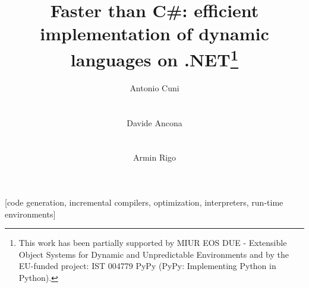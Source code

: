 \documentclass{sig-alternate}
\begin{document}

\title{Faster than C\#: efficient implementation of dynamic languages on
  .NET\thanks{This work has been partially supported by MIUR EOS DUE -
    Extensible Object Systems for Dynamic and Unpredictable Environments and
    by the EU-funded project: IST 004779 PyPy (PyPy: Implementing Python in
    Python).}}



\author{
\alignauthor Antonio Cuni\\
       \\
       \\
\alignauthor Davide Ancona\\
       \\
       \\
\alignauthor Armin Rigo\\
}

\maketitle

[code generation,
incremental compilers, optimization, interpreters, run-time environments]
\end{document}
